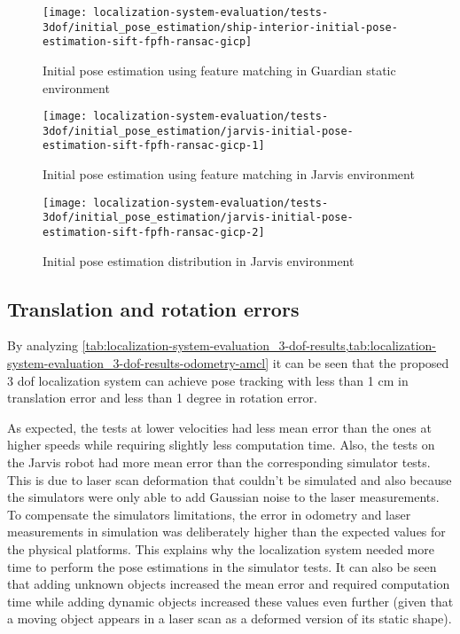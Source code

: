 \begin{figure}[H]
	\centering
	\texttt{[image: localization-system-evaluation/tests-3dof/initial\_pose\_estimation/ship-interior-initial-pose-estimation-sift-fpfh-ransac-gicp]}
	\caption{Initial pose estimation using feature matching in Guardian static environment}
	\label{fig:localization-system-evaluation_ship-interior-initial-pose-estimation-sift-fpfh-ransac-gicp}
\end{figure}

\begin{figure}[H]
	\centering
	\texttt{[image: localization-system-evaluation/tests-3dof/initial\_pose\_estimation/jarvis-initial-pose-estimation-sift-fpfh-ransac-gicp-1]}
	\caption{Initial pose estimation using feature matching in Jarvis environment}
	\label{fig:localization-system-evaluation_jarvis-initial-pose-estimation-sift-fpfh-ransac-gicp-1}
\end{figure}

\begin{figure}[H]
	\centering
	\texttt{[image: localization-system-evaluation/tests-3dof/initial\_pose\_estimation/jarvis-initial-pose-estimation-sift-fpfh-ransac-gicp-2]}
	\caption{Initial pose estimation distribution in Jarvis environment}
	\label{fig:localization-system-evaluation_jarvis-initial-pose-estimation-sift-fpfh-ransac-gicp-2}
\end{figure}




\subsection{Translation and rotation errors}

By analyzing \cref{tab:localization-system-evaluation_3-dof-results,tab:localization-system-evaluation_3-dof-results-odometry-amcl} it can be seen that the proposed 3 \gls{dof} localization system can achieve pose tracking with less than 1 cm in translation error and less than 1 degree in rotation error.

As expected, the tests at lower velocities had less mean error than the ones at higher speeds while requiring slightly less computation time. Also, the tests on the Jarvis robot had more mean error than the corresponding simulator tests. This is due to laser scan deformation that couldn't be simulated and also because the simulators were only able to add Gaussian noise to the laser measurements. To compensate the simulators limitations, the error in odometry and laser measurements in simulation was deliberately higher than the expected values for the physical platforms. This explains why the localization system needed more time to perform the pose estimations in the simulator tests. It can also be seen that adding unknown objects increased the mean error and required computation time while adding dynamic objects increased these values even further (given that a moving object appears in a laser scan as a deformed version of its static shape).

